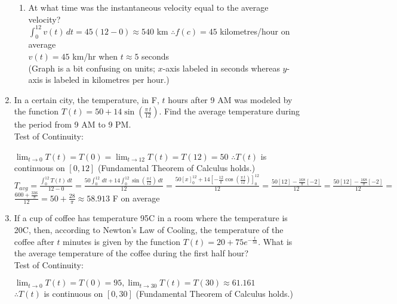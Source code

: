 \documentclass[10pt, letterpaper]{report}
\begin{document}
\begin{enumerate}
\begin{enumerate}
      \item{At what time was the instantaneous velocity equal to the average velocity?} \\

        $\int_{0}^{12}{v(t)}\,dt=
        45(12-0)\approx540$ km $\therefore f(c)=45$ kilometres/hour on average \\

        $v(t)=45$ km/hr when $t\approx5$ seconds \\

        (Graph is a bit confusing on units; $x$-axis labeled in seconds whereas $y$-axis is labeled in kilometres per hour.)

    \end{enumerate}
\hline
  \item{In a certain city, the temperature, in \degree F, $t$ hours after 9 AM was modeled by the function $T(t)=50+14\sin{(\frac{\pi\,t}{12})}$. Find the average temperature during the period from 9 AM to 9 PM. } \\

    Test of Continuity:

    $\lim_{t\to 0}T(t)=T(0)=\lim_{t\to 12}T(t)=T(12)=50$
    $\therefore T(t)$ is continuous on $[0,12]$ (Fundamental Theorem of Calculus holds.) \\

    $T_{avg}=\frac{\int_{0}^{12}{T(t)}\,dt}{12-0}=
    \frac{50\int_{0}^{12}\,dt+14\int_{0}^{12}{\sin{(\frac{\pi\,t}{12})}}\,dt}{12}=
    \frac{50[x]_{0}^{12}+14[-\frac{12}{\pi}\cos{(\frac{\pi\,t}{12})}]_{0}^{12}}{12}=
    \frac{50[12]-\frac{168}{\pi}[-2]}{12}=
    \frac{50[12]-\frac{168}{\pi}[-2]}{12}=$ \\

    $\frac{600+\frac{336}{\pi}}{12}=
    50+\frac{28}{\pi}\approx 58.913$ \degree F on average \\
\pagebreak
  \item{If a cup of coffee has temperature 95\degree C in a room where the temperature is 20\degree C, then, according to Newton's Law of Cooling, the temperature of the coffee after $t$ minutes is given by the function $T(t)=20+75e^{-\frac{t}{50}}$. What is the average temperature of the coffee during the first half hour?} \\

    Test of Continuity:

    $\lim_{t\to 0}T(t)=T(0)=95,
    \lim_{t\to 30}T(t)=T(30)\approx61.161$ \\
    $\therefore T(t)$ is continuous on $[0,30]$ (Fundamental Theorem of Calculus holds.) \\


\end{enumerate}
\end{document}
